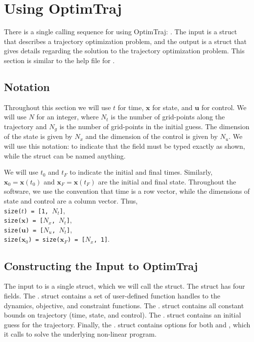 \section{Using OptimTraj}

There is a single calling sequence for using OptimTraj:  . The input  is a struct that describes a trajectory optimization problem, and the output  is a struct that gives details regarding the solution to the trajectory optimization problem. This section is similar to the help file for .

\subsection{Notation}

Throughout this section we will use $t$ for time, $\bm{x}$ for state, and $\bm{u}$ for control. We will use $N$ for an integer, where $N_t$ is the number of grid-points along the trajectory and $N_g$ is the number of grid-points in the initial guess. The dimension of the state is given by $N_x$ and the dimension of the control is given by $N_u$. We will use this notation:  to indicate that the field  must be typed exactly as shown, while the struct  can be named anything.

\par We will use $t_0$ and $t_F$ to indicate the initial and final times. Similarly, $\bm{x}_0 = \bm{x}(t_0)$ and $\bm{x}_F = \bm{x}(t_F)$ are the initial and final state. Throughout the software, we use the convention that time is a row vector, while the dimensions of state and control are a column vector. Thus, \\
\texttt{size($t$) = [1, $N_t$]}, \\
\texttt{size($\bm{x}$) = [$N_x$, $N_t$]}, \\
\texttt{size($\bm{u}$) = [$N_u$, $N_t$]}, \\
\texttt{size($\bm{x}_0$) = size($\bm{x}_F$)  = [$N_x$, 1]}. 


\subsection{Constructing the Input to OptimTraj}

The input to  is a single struct, which we will call the  struct. The  struct has four fields. The . struct contains a set of user-defined function handles to the dynamics, objective, and constraint functions. The . struct contains all constant bounds on trajectory (time, state, and control). The . struct contains an initial guess for the trajectory. Finally, the . struct contains options for both  and , which it calls to solve the underlying non-linear program.

